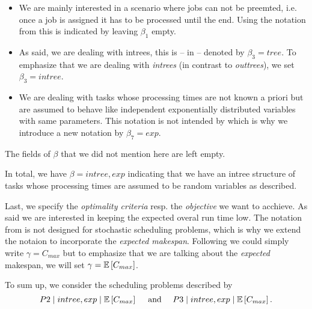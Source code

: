 \begin{itemize}
\item We are mainly interested in a scenario where jobs can not be preemted, i.e. once a job is assigned it has to be processed until the end. Using the notation from \cite{schedulingclassification} this is indicated by leaving $\beta_1$ empty.
\item As said, we are dealing with intrees, this is -- in \cite{schedulingclassification} -- denoted by $\beta_3=tree$. To emphasize that we are dealing with \emph{intrees} (in contrast to \emph{outtrees}), we set $\beta_3=intree$.
\item We are dealing with tasks whose processing times are not known a priori but are assumed to behave like  independent exponentially distributed variables with same parameters. This notation is not intended by \cite{schedulingclassification} which is why we introduce a new notation by $\beta_7 = exp$.
\end{itemize}

The fields of $\beta$ that we did not mention here are left empty.

In total, we have $\beta = intree, exp$ indicating that we have an intree structure of tasks whose processing times are assumed to be random variables as described.

Last, we specify the \emph{optimality criteria} resp. the \emph{objective} we want to acchieve. As said we are interested in keeping the expected overal run time low. The notation from \cite{schedulingclassification} is not designed for stochastic scheduling problems, which is why we extend the notaion to incorporate the \emph{expected makespan}. Following \cite{pinedo2008scheduling} we could simply write $\gamma = C_{max}$ but to emphasize that we are talking about the \emph{expected} makespan, we will set $\gamma = \mathbb{E}\left[ C_{max} \right]$.

To sum up, we consider the scheduling problems described by
\begin{equation*}
  P2 \mid intree, exp \mid \mathbb{E}\left[ C_{max} \right] 
  \quad \text{ and } \quad
  P3 \mid intree, exp \mid \mathbb{E}\left[ C_{max} \right]
  .
\end{equation*}


